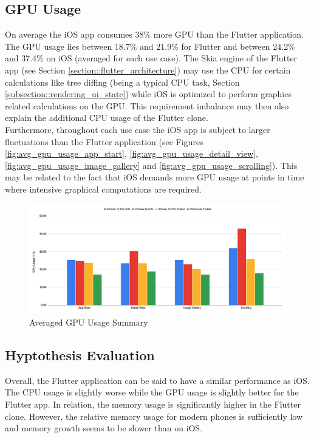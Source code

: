 \subsection{GPU Usage}
On average the iOS app consumes 38\% more GPU than the Flutter application. The GPU usage lies between 18.7\% and 21.9\% for Flutter and between 24.2\% and 37.4\% on iOS (averaged for each use case).
The Skia engine of the Flutter app (see Section \ref{section::flutter_architecture}) may use the CPU for certain calculations like tree diffing (being a typical CPU task, Section \ref{subsection::rendering_ui_state}) while iOS is optimized to perform graphics related calculations on the GPU.
This requirement imbalance may then also explain the additional CPU usage of the Flutter clone.\\
Furthermore, throughout each use case the iOS app is subject to larger fluctuations than the Flutter application (see Figures \ref{fig:avg_gpu_usage_app_start}, \ref{fig:avg_gpu_usage_detail_view}, \ref{fig:avg_gpu_usage_image_gallery} and \ref{fig:avg_gpu_usage_scrolling}).
This may be related to the fact that iOS demands more GPU usage at points in time where intensive graphical computations are required.

\begin{figure}[!h]
    \centering
    \includegraphics[width=\linewidth]{images/performance_results/summary_charts/avg_gpu_usage_summary.png}
    \caption{Averaged GPU Usage Summary}
    \label{fig:avg_gpu_usage_summary}
\end{figure}

\subsection{Hyptothesis Evaluation} \label{subsection::hypothesis_evaluation}
Overall, the Flutter application can be said to have a similar performance as iOS. The CPU usage is slightly worse while the GPU usage is slightly better for the Flutter app.
In relation, the memory usage is significantly higher in the Flutter clone. However, the relative memory usage for modern phones is sufficiently low and memory growth seems to be slower than
on iOS.


